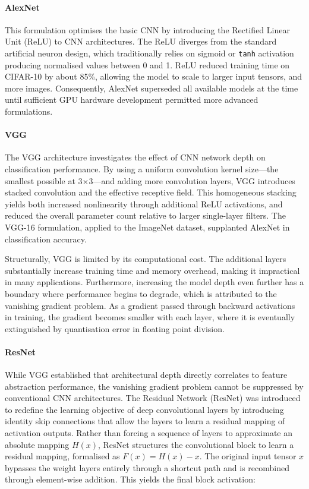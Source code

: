 \documentclass[10pt, a4paper]{article}
\begin{document}
\paragraph{AlexNet} This formulation optimises the basic CNN by introducing the Rectified Linear Unit (ReLU) to CNN architectures\cite{krizhevsky_imagenet_2017}. The ReLU diverges from the standard artificial neuron design, which traditionally relies on sigmoid or \texttt{tanh} activation producing normalised values between 0 and 1\cite{nair_rectified_2010}. ReLU reduced training time on CIFAR-10 by about 85\%, allowing the model to scale to larger input tensors, and more images\cite{krizhevsky_imagenet_2017}. Consequently, AlexNet superseded all available models at the time until sufficient GPU hardware development permitted more advanced formulations.

\paragraph{VGG} The VGG architecture investigates the effect of CNN network depth on classification performance\cite{simonyan_very_2015}. By using a uniform convolution kernel size---the smallest possible at 3$\times$3---and adding more convolution layers, VGG introduces stacked convolution and the effective receptive field. This homogeneous stacking yields both increased nonlinearity through additional ReLU activations, and reduced the overall parameter count relative to larger single-layer filters. The VGG-16 formulation, applied to the ImageNet dataset, supplanted AlexNet in classification accuracy.

Structurally, VGG is limited by its computational cost. The additional layers substantially increase training time and memory overhead, making it impractical in many applications. Furthermore, increasing the model depth even further has a boundary where performance begins to degrade, which is attributed to the vanishing gradient problem. As a gradient passed through backward activations in training, the gradient becomes smaller with each layer, where it is eventually extinguished by quantisation error in floating point division.

\paragraph{ResNet} While VGG established that architectural depth directly correlates to feature abstraction performance, the vanishing gradient problem cannot be suppressed by conventional CNN architectures. The Residual Network (ResNet) was introduced to redefine the learning objective of deep convolutional layers by introducing identity skip connections that allow the layers to learn a residual mapping of activation outputs\cite{he_deep_2015}. Rather than forcing a sequence of layers to approximate an absolute mapping $H(x)$, ResNet structures the convolutional block to learn a residual mapping, formalised as $F(x) = H(x)-x$. The original input tensor $x$ bypasses the weight layers entirely through a shortcut path and is recombined through element-wise addition. This yields the final block activation:
\end{document}
